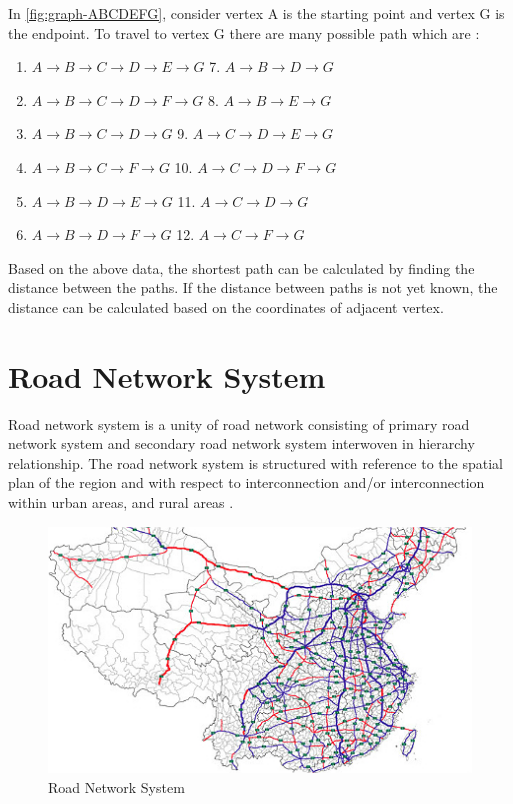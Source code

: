 In \ref{fig:graph-ABCDEFG}, consider vertex A is the starting point and vertex G is the endpoint. To travel to vertex G there are many possible path which are :

\begin{enumerate}[leftmargin=*, topsep=5pt, itemsep=-1ex, partopsep=1ex, parsep=2ex]
\item $A \to B \to C \to D \to E \to G$ \hspace{10mm} 7. \hspace{0.5mm} $A \to B \to D \to G$
\item $A \to B \to C \to D \to F \to G$ \hspace{10mm} 8. \hspace{0.5mm} $A \to B \to E \to G$
\item $A \to B \to C \to D \to G$ \hspace{20mm} 9. \hspace{0.5mm} $A \to C \to D \to E \to G$
\item $A \to B \to C \to F \to G$ \hspace{20mm} 10. $A \to C \to D \to F \to G$
\item $A \to B \to D \to E \to G$ \hspace{20mm} 11. $A \to C \to D \to G$
\item $A \to B \to D \to F \to G$ \hspace{20mm} 12. $A \to C \to F \to G$
\end{enumerate}

Based on the above data, the shortest path can be calculated by finding the distance between the paths. If the distance between paths is not yet known, the distance can be calculated based on the coordinates of adjacent vertex.

\section{Road Network System}
Road network system is a unity of road network consisting of primary road network system and secondary road network system interwoven in hierarchy relationship. The road network system is structured with reference to the spatial plan of the region and with respect to interconnection and/or interconnection within urban areas, and rural areas \cite{zhang2005} \cite{weiping1989}.

\begin{figure}[H]
    \centering
    \includegraphics[scale=0.7]{road-network.jpg}
    \caption{Road Network System}
    \label{fig:Road Network System}
\end{figure}

